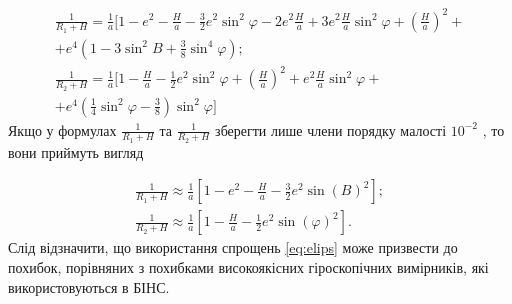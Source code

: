 \[\begin{array}{l} 
{\frac{1}{R_{1} +H} =\frac{1}{a} [1-e^{2} -\frac{H}{a} 
-\frac{3}{2} e^{2} \sin ^{2} \varphi-2e^{2} \frac{H}{a} +3e^{2} \frac{H}{a} \sin 
^{2} \varphi + (\frac{H}{a} )^{2} +}\\
{+e^{4} (1-3\sin ^{2} B+\frac{3}{8}\sin ^{4} \varphi);} \\ 

{\frac{1}{R_{2} +H} =\frac{1}{a}[1-\frac{H}{a} 
-\frac{1}{2} e^{2} \sin ^{2} \varphi+(\frac{H}{a})^{2} +e^{2} \frac{H}{a} 
\sin ^{2} \varphi+} \\ 
{+e^{4}(\frac{1}{4} \sin ^{2} \varphi-\frac{3}{8})\sin ^{2} \varphi]} 
\end{array}\] 
Якщо у формулах $\frac{1}{R_{1} +H}$ та $\frac{1}{R_{2} +H}$ 
зберегти лише члени порядку малості $10^{-2}$ , то вони приймуть 
вигляд

\begin{equation} 
\label{eq:elips} 
\begin{array}{l} 
{\frac{1}{R_{1} +H} \approx \frac{1}{a}[1-e^{2} -\frac{H}{a} -\frac{3}{2} e^{2} \sin(B)^{2}];} \\ 
{\frac{1}{R_{2} +H} \approx \frac{1}{a}[1-\frac{H}{a} -\frac{1}{2} e^{2} \sin(\varphi)^{2}].} 
\end{array} 
\end{equation} 
Слід відзначити, що використання спрощень \eqref{eq:elips} може призвести 
до похибок, порівняних з похибками високоякісних гіроскопічних вимірників, які використовуються 
в БІНС.

